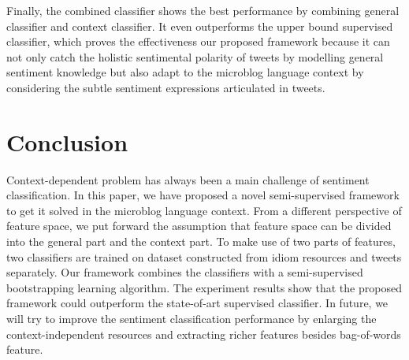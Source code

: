 Finally, the combined classifier shows the best performance by combining general classifier and context classifier. 
It even outperforms the upper bound supervised classifier, which proves the effectiveness our proposed framework because it can not only catch the holistic sentimental polarity of tweets by modelling general sentiment knowledge but also adapt to the microblog language context by considering the subtle sentiment expressions articulated in tweets.

\section{Conclusion}
\label{conclusion}

Context-dependent problem has always been a main challenge of sentiment classification.
In this paper, we have proposed a novel semi-supervised framework to get it solved in the microblog language context. 
From a different perspective of feature space, we put forward the assumption that feature space can be divided into the general part and the context part.
To make use of two parts of features, two classifiers are trained on dataset constructed from idiom resources and tweets separately. 
Our framework combines the classifiers with a semi-supervised bootstrapping learning algorithm. 
The experiment results show that the proposed framework could outperform the state-of-art supervised classifier. 
In future, we will try to improve the sentiment classification performance by enlarging the context-independent resources and extracting richer features besides bag-of-words feature.
